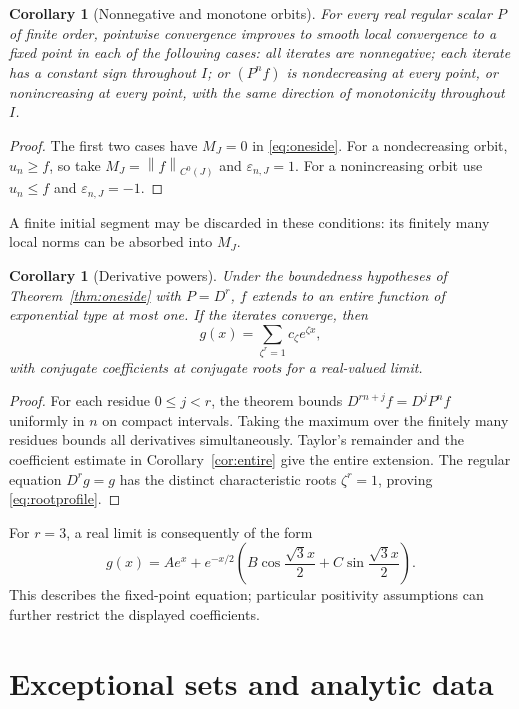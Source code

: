 \documentclass[11pt,reqno]{amsart}
\numberwithin{equation}{section}
\newtheorem{corollary}[theorem]{Corollary}
\theoremstyle{definition}
\theoremstyle{remark}
\newcommand{\norm}[1]{\left\lVert #1\right\rVert}
\begin{document}
\begin{corollary}[Nonnegative and monotone orbits]\label{cor:monotone}
For every real regular scalar $P$ of finite order, pointwise convergence improves to smooth local convergence to a fixed point in each of the following cases: all iterates are nonnegative; each iterate has a constant sign throughout $I$; or $(P^nf)$ is nondecreasing at every point, or nonincreasing at every point, with the same direction of monotonicity throughout $I$.
\end{corollary}
\begin{proof}
The first two cases have $M_J=0$ in \eqref{eq:oneside}. For a nondecreasing orbit, $u_n\ge f$, so take $M_J=\norm{f}_{C^0(J)}$ and $\varepsilon_{n,J}=1$. For a nonincreasing orbit use $u_n\le f$ and $\varepsilon_{n,J}=-1$.
\end{proof}
A finite initial segment may be discarded in these conditions: its finitely many local norms can be absorbed into $M_J$.

\begin{corollary}[Derivative powers]\label{cor:powers}
Under the boundedness hypotheses of Theorem~\ref{thm:oneside} with $P=D^r$, $f$ extends to an entire function of exponential type at most one. If the iterates converge, then
\begin{equation}\label{eq:rootprofile}
 g(x)=\sum_{\zeta^r=1}c_\zeta e^{\zeta x},
\end{equation}
with conjugate coefficients at conjugate roots for a real-valued limit.
\end{corollary}
\begin{proof}
For each residue $0\le j<r$, the theorem bounds $D^{rn+j}f=D^jP^nf$ uniformly in $n$ on compact intervals. Taking the maximum over the finitely many residues bounds all derivatives simultaneously. Taylor's remainder and the coefficient estimate in Corollary~\ref{cor:entire} give the entire extension. The regular equation $D^rg=g$ has the distinct characteristic roots $\zeta^r=1$, proving \eqref{eq:rootprofile}.
\end{proof}
For $r=3$, a real limit is consequently of the form
\[
 g(x)=A e^x+e^{-x/2}
       \left(B\cos\frac{\sqrt3x}{2}+C\sin\frac{\sqrt3x}{2}\right).
\]
This describes the fixed-point equation; particular positivity assumptions can further restrict the displayed coefficients.

\section{Exceptional sets and analytic data}\label{sec:exceptional}
\end{document}
